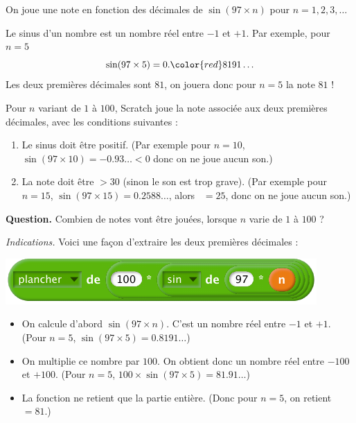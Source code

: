 \documentclass[class=report,crop=false, 12pt]{standalone}
\begin{document}


\begin{enigme}

On joue une note en fonction des décimales de $\sin( 97 \times n )$ pour  
$n=1,2,3,\ldots$

Le sinus d'un nombre est un nombre réel entre $-1$ et $+1$.
Par exemple, pour $n = 5$ 
$$\sin( 97 \times 5 ) = 0.{\color{red}81}91\ldots$$
Les deux premières décimales sont $81$, on jouera donc pour $n=5$ la note $81$ !



Pour $n$ variant de $1$ à $100$, Scratch joue la note associée aux deux premières décimales, avec les conditions suivantes :
\begin{enumerate}
  \item Le sinus doit être positif. (Par exemple pour $n=10$, $\sin( 97 \times 10)=-0.93\ldots< 0$ donc on ne joue aucun son.)
  \item La note doit être $>30$ (sinon le son est trop grave). (Par exemple pour $n=15$, $\sin( 97\times 15 )=0.2588\ldots$, alors \, $=25$, donc on ne joue aucun son.)
\end{enumerate}


\bigskip

\textbf{Question.} Combien de notes vont être jouées, lorsque $n$ varie de $1$ à $100$ ?


\bigskip

\emph{Indications.}
Voici une façon d'extraire les deux premières décimales :
\begin{center}
  \includegraphics[scale=\scalebloc]{bloc-09-eg1} 
\end{center}

\begin{itemize}
  \item On calcule d'abord $\sin(97 \times n)$. C'est un nombre réel entre $-1$ et $+1$.
  (Pour $n=5$, $\sin(97 \times 5) = 0.8191\ldots$)
  \item On multiplie ce nombre par $100$. On obtient donc un nombre réel entre $-100$ et $+100$. (Pour $n=5$, $100 \times \sin(97 \times 5 ) = 81.91\ldots$)
  \item La fonction  ne retient que la partie entière.
(Donc pour $n=5$, on retient \,$ = 81$.)
\end{itemize}




\end{enigme}
\end{document}
